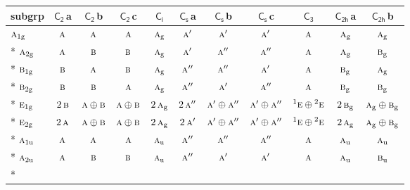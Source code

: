 \documentclass[10pt,a4paper]{article}
\numberwithin{equation}{section}
\newcommand{\grp}[1]{\mathsf{#1}}
\newcommand{\irr}[1]{\text{\normalfont\scshape #1}}
\newcommand{\conjpair}[1]{{}^{#1}}
\newcommand{\ptag}[1]{\mathrm{#1}}
\newcommand{\clsletter}[1]{\,{\scriptsize\color{black!55}#1}}
\begin{document}
{\small\begin{longtable}{@{}lcccccccccc@{}}\toprule
subgrp & \href{C2.pdf}{$\grp{C_{2}}$}\clsletter{a} & \href{C2.pdf}{$\grp{C_{2}}$}\clsletter{b} & \href{C2.pdf}{$\grp{C_{2}}$}\clsletter{c} & \href{S2.pdf}{$\grp{C_{i}}$} & \href{C1v.pdf}{$\grp{C_{s}}$}\clsletter{a} & \href{C1v.pdf}{$\grp{C_{s}}$}\clsletter{b} & \href{C1v.pdf}{$\grp{C_{s}}$}\clsletter{c} & \href{C3.pdf}{$\grp{C_{3}}$} & \href{C2h.pdf}{$\grp{C_{2h}}$}\clsletter{a} & \href{C2h.pdf}{$\grp{C_{2h}}$}\clsletter{b}\\\midrule\endhead
\bottomrule\endfoot\endlastfoot
$\irr{a}_{1\ptag{g}}$ & $\irr{a}$ & $\irr{a}$ & $\irr{a}$ & $\irr{a}_{\ptag{g}}$ & $\irr{a}'$ & $\irr{a}'$ & $\irr{a}'$ & $\irr{a}$ & $\irr{a}_{\ptag{g}}$ & $\irr{a}_{\ptag{g}}$\\*
$\irr{a}_{2\ptag{g}}$ & $\irr{a}$ & $\irr{b}$ & $\irr{b}$ & $\irr{a}_{\ptag{g}}$ & $\irr{a}'$ & $\irr{a}''$ & $\irr{a}''$ & $\irr{a}$ & $\irr{a}_{\ptag{g}}$ & $\irr{b}_{\ptag{g}}$\\*
$\irr{b}_{1\ptag{g}}$ & $\irr{b}$ & $\irr{a}$ & $\irr{b}$ & $\irr{a}_{\ptag{g}}$ & $\irr{a}''$ & $\irr{a}''$ & $\irr{a}'$ & $\irr{a}$ & $\irr{b}_{\ptag{g}}$ & $\irr{a}_{\ptag{g}}$\\*
$\irr{b}_{2\ptag{g}}$ & $\irr{b}$ & $\irr{b}$ & $\irr{a}$ & $\irr{a}_{\ptag{g}}$ & $\irr{a}''$ & $\irr{a}'$ & $\irr{a}''$ & $\irr{a}$ & $\irr{b}_{\ptag{g}}$ & $\irr{b}_{\ptag{g}}$\\*
$\irr{e}_{1\ptag{g}}$ & $2\,\irr{b}$ & $\irr{a}\oplus \irr{b}$ & $\irr{a}\oplus \irr{b}$ & $2\,\irr{a}_{\ptag{g}}$ & $2\,\irr{a}''$ & $\irr{a}'\oplus \irr{a}''$ & $\irr{a}'\oplus \irr{a}''$ & $\conjpair{1}\irr{e}\oplus \conjpair{2}\irr{e}$ & $2\,\irr{b}_{\ptag{g}}$ & $\irr{a}_{\ptag{g}}\oplus \irr{b}_{\ptag{g}}$\\*
$\irr{e}_{2\ptag{g}}$ & $2\,\irr{a}$ & $\irr{a}\oplus \irr{b}$ & $\irr{a}\oplus \irr{b}$ & $2\,\irr{a}_{\ptag{g}}$ & $2\,\irr{a}'$ & $\irr{a}'\oplus \irr{a}''$ & $\irr{a}'\oplus \irr{a}''$ & $\conjpair{1}\irr{e}\oplus \conjpair{2}\irr{e}$ & $2\,\irr{a}_{\ptag{g}}$ & $\irr{a}_{\ptag{g}}\oplus \irr{b}_{\ptag{g}}$\\*
$\irr{a}_{1\ptag{u}}$ & $\irr{a}$ & $\irr{a}$ & $\irr{a}$ & $\irr{a}_{\ptag{u}}$ & $\irr{a}''$ & $\irr{a}''$ & $\irr{a}''$ & $\irr{a}$ & $\irr{a}_{\ptag{u}}$ & $\irr{a}_{\ptag{u}}$\\*
$\irr{a}_{2\ptag{u}}$ & $\irr{a}$ & $\irr{b}$ & $\irr{b}$ & $\irr{a}_{\ptag{u}}$ & $\irr{a}''$ & $\irr{a}'$ & $\irr{a}'$ & $\irr{a}$ & $\irr{a}_{\ptag{u}}$ & $\irr{b}_{\ptag{u}}$\\*

\end{longtable}}
\end{document}
